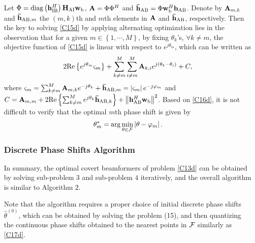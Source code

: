 \documentclass[10pt,journal,letterpaper,twocolumn,twoside]{IEEEtran} %
\begin{document}
Let $\Phi  = {\rm {diag}}\left( {{\bf{h}}_{{\rm{IB}}}^H} \right){{\bf{H}}_{{\rm{AI}}}}{{\bf{w}}_{\rm{b}}}$, ${\bf{A}} = \Phi {\Phi ^H}$ and ${{{\bf{\bar h}}}_{{\rm{AB}}}} = \Phi {{\bf{w}}_{\rm{b}}^H}{{\bf{h}}_{{\rm{AB}}}}$.
Denote by ${{\bf{A}}_{m,k}}$ and ${{{\bf{\bar h}}}_{{\rm{AB}},m}}$ the $\left( {m,k} \right)$th and $m$th elements in ${\bf{A}}$ and ${{{\bf{\bar h}}}_{{\rm{AB}}}}$, respectively. Then the key to solving \eqref{C15d} by applying alternating optimization lies
in the observation that for a given $m \in \left\{ {1, \cdots ,M} \right\}$, by fixing ${\theta _k}$'s, $\forall k \ne m$, the objective function of \eqref{C15d} is linear with respect to ${e^{j{\theta _m}}}$, which can be written as
\begin{align}\label{C16d}
2{\mathop{\rm Re}\nolimits} \left\{ {{e^{j{\theta _m}}}{\varsigma _m}} \right\} + \sum\limits_{k \ne m}^M {\sum\limits_{i \ne m}^M {{{\bf{A}}_{k,i}}{e^{j\left( {{\theta _k} - {\theta _i}} \right)}}} }  + C,
 \end{align}
where ${\varsigma _m} = \sum\nolimits_{k \ne m}^M {{{\bf{A}}_{m,k}}{e^{ - j{\theta _k}}}}  + {{{\bf{\bar h}}}_{{\rm{AB}},m}} = \left| {{\varsigma _m}} \right|{e^{ - j{\varphi _m}}}$ and $C = {{\bf{A}}_{m,m}} + 2{\mathop{\rm Re}\nolimits} \left\{ {\sum\nolimits_{k \ne m}^M {{e^{j{\theta _k}}}} {{{\bf{\bar h}}}_{{\rm{AB}},k}}} \right\} + {\left\| {{\bf{h}}_{{\rm{AB}}}^H{{\bf{w}}_{\rm{b}}}} \right\|^2}$. Based on \eqref{C16d}, it is not difficult to verify that the optimal $m$th phase shift is given by \cite{WuQ2019Beamforming}
\begin{align}\label{C17d}
\theta _m^ *  = \arg \mathop {\min }\limits_{\theta  \in {\cal { F}}} \left| {\theta  - {\varphi _m}} \right|.
 \end{align}



 \subsubsection{{Discrete Phase Shifts Algorithm}}

In summary, the optimal covert beamformers of   problem \eqref{C13d}  can be obtained by
  solving   sub-problem $3$ and sub-problem $4$ iteratively, and the overall algorithm   is similar to Algorithm $2$.

Note that the algorithm requires a proper choice of initial
discrete phase shifts ${{{\hat \theta }} ^{\left( 0 \right)}}$, which can be obtained by solving the problem (15),
and then quantizing the continuous phase shifts
obtained to the nearest points in ${\cal { F}}$ similarly as \eqref{C17d}.
\end{document}
